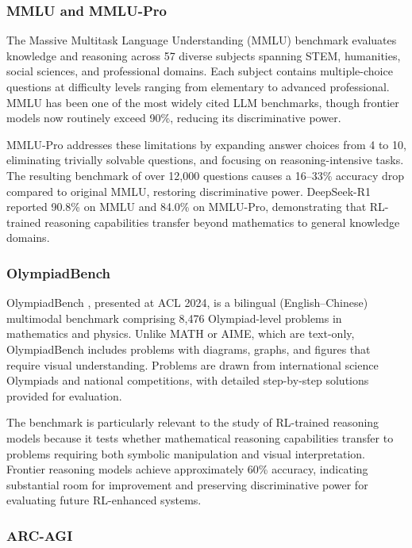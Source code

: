 \documentclass[12pt,a4paper]{report}
\begin{document}
\subsubsection{MMLU and MMLU-Pro}

The Massive Multitask Language Understanding (MMLU) benchmark \cite{hendrycks2021mmlu} evaluates knowledge and reasoning across 57 diverse subjects spanning STEM, humanities, social sciences, and professional domains. Each subject contains multiple-choice questions at difficulty levels ranging from elementary to advanced professional. MMLU has been one of the most widely cited LLM benchmarks, though frontier models now routinely exceed 90\%, reducing its discriminative power.

MMLU-Pro \cite{wang2024mmlupro} addresses these limitations by expanding answer choices from 4 to 10, eliminating trivially solvable questions, and focusing on reasoning-intensive tasks. The resulting benchmark of over 12,000 questions causes a 16--33\% accuracy drop compared to original MMLU, restoring discriminative power. DeepSeek-R1 reported 90.8\% on MMLU and 84.0\% on MMLU-Pro, demonstrating that RL-trained reasoning capabilities transfer beyond mathematics to general knowledge domains.

\subsubsection{OlympiadBench}

OlympiadBench \cite{he2024olympiadbench}, presented at ACL 2024, is a bilingual (English--Chinese) multimodal benchmark comprising 8,476 Olympiad-level problems in mathematics and physics. Unlike MATH or AIME, which are text-only, OlympiadBench includes problems with diagrams, graphs, and figures that require visual understanding. Problems are drawn from international science Olympiads and national competitions, with detailed step-by-step solutions provided for evaluation.

The benchmark is particularly relevant to the study of RL-trained reasoning models because it tests whether mathematical reasoning capabilities transfer to problems requiring both symbolic manipulation and visual interpretation. Frontier reasoning models achieve approximately 60\% accuracy, indicating substantial room for improvement and preserving discriminative power for evaluating future RL-enhanced systems.

\subsubsection{ARC-AGI}
\end{document}
